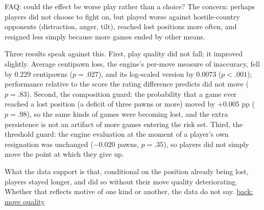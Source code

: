 \documentclass[aspectratio=169,11pt,t]{beamer}
\newcommand{\backto}[2]{\vfill\hfill\hyperlink{#1}{\textcolor{linkblue}{\scriptsize\textsf{back: #2}}}}
\begin{document}
\begin{frame}[label=faq-worseplay]{FAQ: could the effect be worse play rather than a choice?}
  \footnotesize
  The concern: perhaps players did not choose to fight on, but played worse against hostile-country opponents (distraction, anger, tilt), reached lost positions more often, and resigned less simply because more games ended by other means.

  Three results speak against this. First, play quality did not fall; it improved slightly. Average centipawn loss, the engine's per-move measure of inaccuracy, fell by 0.229 centipawns ($p = .027$), and its log-scaled version by 0.0073 ($p < .001$); performance relative to the score the rating difference predicts did not move ($p = .83$). Second, the composition guard: the probability that a game ever reached a lost position (a deficit of three pawns or more) moved by $+0.005$ pp ($p = .98$), so the same kinds of games were becoming lost, and the extra persistence is not an artifact of more games entering the risk set. Third, the threshold guard: the engine evaluation at the moment of a player's own resignation was unchanged ($-0.020$ pawns, $p = .35$), so players did not simply move the point at which they give up.

  What the data support is that, conditional on the position already being lost, players stayed longer, and did so without their move quality deteriorating. Whether that reflects motive of one kind or another, the data do not say.
  \backto{quality}{move quality}
\end{frame}
\end{document}
